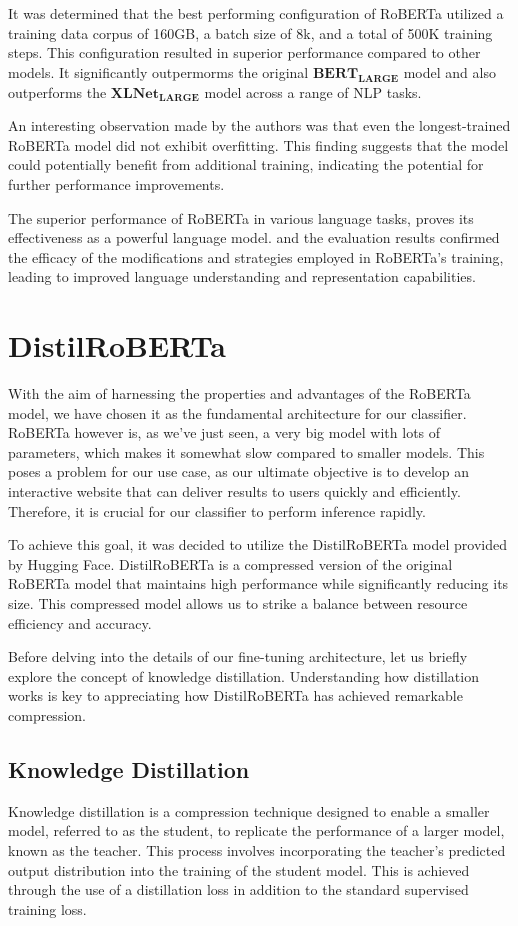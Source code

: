\documentclass[a4paper,12pt]{report} %
\begin{document}
It was determined that the best performing configuration of RoBERTa utilized a training data corpus of 160GB, a batch size of 8k, and a total of 500K training steps. This configuration resulted in superior performance compared to other models. It significantly outpermorms the original $\mathbf{BERT_{LARGE}}$ model and also outperforms the $\mathbf{XLNet_{LARGE}}$ model across a range of NLP tasks.

An interesting observation made by the authors was that even the longest-trained RoBERTa model did not exhibit overfitting. This finding suggests that the model could potentially benefit from additional training, indicating the potential for further performance improvements.

The superior performance of RoBERTa in various language tasks, proves its effectiveness as a powerful language model. and the evaluation results confirmed the efficacy of the modifications and strategies employed in RoBERTa's training, leading to improved language understanding and representation capabilities.

\section{DistilRoBERTa} %
With the aim of harnessing the properties and advantages of the RoBERTa model, we have chosen it as the fundamental architecture for our classifier. RoBERTa however is, as we've just seen, a very big model with lots of parameters, which makes it somewhat slow compared to smaller models. This poses a problem for our use case, as our ultimate objective is to develop an interactive website that can deliver results to users quickly and efficiently. Therefore, it is crucial for our classifier to perform inference rapidly.

To achieve this goal, it was decided to utilize the DistilRoBERTa model provided by Hugging Face. DistilRoBERTa is a compressed version of the original RoBERTa model that maintains high performance while significantly reducing its size. This compressed model allows us to strike a balance between resource efficiency and accuracy.

Before delving into the details of our fine-tuning architecture, let us briefly explore the concept of knowledge distillation. Understanding how distillation works is key to appreciating how DistilRoBERTa has achieved remarkable compression.

\subsection{Knowledge Distillation} %
Knowledge distillation is a compression technique designed to enable a smaller model, referred to as the student, to replicate the performance of a larger model, known as the teacher. This process involves incorporating the teacher's predicted output distribution into the training of the student model. This is achieved through the use of a distillation loss in addition to the standard supervised training loss.
\end{document}
